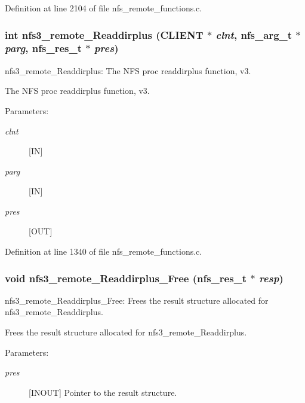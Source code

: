 Definition at line 2104 of file nfs\_\-remote\_\-functions.c.
\subsubsection[{nfs3\_\-remote\_\-Readdirplus}]{\setlength{\rightskip}{0pt plus 5cm}int nfs3\_\-remote\_\-Readdirplus (CLIENT $\ast$ {\em clnt}, \/  nfs\_\-arg\_\-t $\ast$ {\em parg}, \/  nfs\_\-res\_\-t $\ast$ {\em pres})}\label{group__NFSprocs_g9da731a0753d61a44ac25e9a640ce556}


nfs3\_\-remote\_\-Readdirplus: The NFS proc readdirplus function, v3.

The NFS proc readdirplus function, v3.

\begin{Desc}
\item[Parameters:]
\begin{description}
\item[{\em clnt}][IN] \item[{\em parg}][IN] \item[{\em pres}][OUT] \end{description}
\end{Desc}


Definition at line 1340 of file nfs\_\-remote\_\-functions.c.
\subsubsection[{nfs3\_\-remote\_\-Readdirplus\_\-Free}]{\setlength{\rightskip}{0pt plus 5cm}void nfs3\_\-remote\_\-Readdirplus\_\-Free (nfs\_\-res\_\-t $\ast$ {\em resp})}\label{group__NFSprocs_g92f65acab38933aa9ee83e340f9ba3fe}


nfs3\_\-remote\_\-Readdirplus\_\-Free: Frees the result structure allocated for nfs3\_\-remote\_\-Readdirplus.

Frees the result structure allocated for nfs3\_\-remote\_\-Readdirplus.

\begin{Desc}
\item[Parameters:]
\begin{description}
\item[{\em pres}][INOUT] Pointer to the result structure. \end{description}
\end{Desc}


